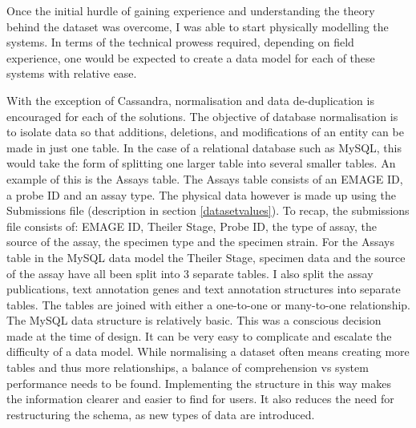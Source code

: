 Once the initial hurdle of gaining experience and understanding the theory behind the dataset was overcome, I was able to start physically modelling the systems. In terms of the technical prowess required, depending on field experience, one would be expected to create a data model for each of these systems with relative ease.

With the exception of Cassandra, normalisation and data de-duplication is encouraged for each of the solutions. The objective of database normalisation is to isolate data so that additions, deletions, and modifications of an entity can be made in just one table. In the case of a relational database such as MySQL, this would take the form of splitting one larger table into several smaller tables. An example of this is the Assays table. The Assays table consists of an EMAGE ID, a probe ID and an assay type. The physical data however is made up using the Submissions file (description in section \ref{datasetvalues}). To recap, the submissions file consists of: EMAGE ID, Theiler Stage, Probe ID, the type of assay, the source of the assay, the specimen type and the specimen strain. For the Assays table in the MySQL data model the Theiler Stage, specimen data and the source of the assay have all been split into 3 separate tables. I also split the assay publications, text annotation genes and text annotation structures into separate tables. The tables are joined with either a one-to-one or many-to-one relationship. The MySQL data structure is relatively basic. This was a conscious decision made at the time of design. It can be very easy to complicate and escalate the difficulty of a data model. While normalising a dataset often means creating more tables and thus more relationships, a balance of comprehension vs system performance needs to be found. Implementing the structure in this way makes the information clearer and easier to find for users. It also reduces the need for restructuring the schema, as new types of data are introduced.

